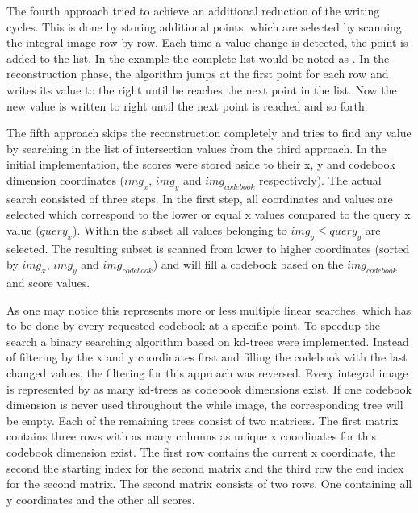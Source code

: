 The fourth approach tried to achieve an additional reduction of the writing cycles. This is done by storing additional points, which are selected by scanning the integral image row by row. Each time a value change is detected, the point is added to the list. In the example the complete list would be noted as . In the reconstruction phase, the algorithm jumps at the first point for each row and writes its value to the right until he reaches the next point in the list. Now the new value is written to right until the next point is reached and so forth.

The fifth approach skips the reconstruction completely and tries to find any value by searching in the list of intersection values from the third approach. In the initial implementation, the scores were stored aside to their x, y and codebook dimension coordinates ($img_x$, $img_y$ and $img_{codebook}$ respectively). The actual search consisted of three steps. In the first step, all coordinates and values are selected which correspond to the lower or equal x values compared to the query x value ($query_x$). Within the subset all values belonging to $img_y \le query_y$ are selected. The resulting subset is scanned from lower to higher coordinates (sorted by $img_x$, $img_y$ and $img_{codebook}$) and will fill a codebook based on the $img_{codebook}$ and score values. %

As one may notice this represents more or less multiple linear searches, which has to be done by every requested codebook at a specific point. To speedup the search a binary searching algorithm based on kd-trees were implemented. %
Instead of filtering by the x and y coordinates first and filling the codebook with the last changed values, the filtering for this approach was reversed. Every integral image is represented by as many kd-trees as codebook dimensions exist. If one codebook dimension is never used throughout the while image, the corresponding tree will be empty. Each of the remaining trees consist of two matrices. The first matrix contains three rows with as many columns as unique x coordinates for this codebook dimension exist. The first row contains the current x coordinate, the second the starting index for the second matrix and the third row the end index for the second matrix. The second matrix consists of two rows. One containing all y coordinates and the other all scores.

